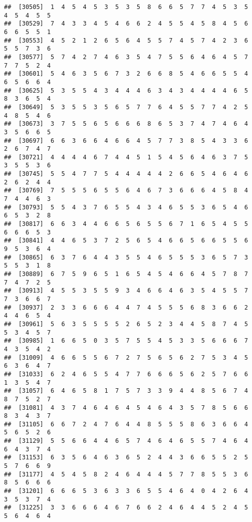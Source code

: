 \documentclass[
]{book}
\begin{document}
\begin{verbatim}
##  [30505]  1  4  5  4  5  3  5  3  5  8  6  6  5  7  7  4  5  3  5  4  5  4  5  5
##  [30529]  7  4  3  3  4  5  4  6  6  2  4  5  5  4  5  8  4  5  6  6  6  5  5  1
##  [30553]  4  5  2  1  2  6  5  6  4  5  5  7  4  5  7  4  2  3  6  5  5  7  3  6
##  [30577]  5  7  4  2  7  4  6  3  5  4  7  5  5  6  4  6  4  5  7  7  7  5  2  4
##  [30601]  5  4  6  3  5  6  7  3  2  6  6  8  5  4  6  6  5  5  4  6  5  6  6  4
##  [30625]  5  3  5  5  4  3  4  4  4  6  3  4  3  4  4  4  4  6  5  8  3  6  5  4
##  [30649]  5  3  5  5  3  5  6  5  7  7  6  4  5  5  7  7  4  2  5  4  8  5  4  6
##  [30673]  3  7  5  5  6  5  6  6  6  8  6  5  3  7  4  7  4  6  4  3  5  6  6  5
##  [30697]  6  6  3  6  6  4  6  6  4  5  7  7  3  8  5  4  3  3  6  2  6  7  4  7
##  [30721]  4  4  4  4  6  7  4  4  5  1  5  4  5  6  4  6  3  7  5  3  5  5  3  6
##  [30745]  5  5  4  7  7  5  4  4  4  4  4  2  6  6  5  4  6  4  6  2  6  2  4  4
##  [30769]  7  5  5  5  6  5  5  6  4  6  7  3  6  6  6  4  5  8  4  7  4  4  6  3
##  [30793]  5  5  4  3  7  6  5  5  4  3  4  6  5  5  3  6  5  4  6  6  5  3  2  8
##  [30817]  6  6  3  4  4  6  6  5  6  5  5  6  7  1  6  5  4  5  5  6  6  6  5  3
##  [30841]  4  4  6  5  3  7  2  5  6  5  4  6  6  5  6  6  5  5  6  9  5  3  6  4
##  [30865]  6  3  7  6  4  4  3  5  5  4  6  5  5  5  3  6  5  7  3  5  5  3  1  8
##  [30889]  6  7  5  9  6  5  1  6  5  4  5  4  6  6  4  5  7  8  7  7  4  7  2  5
##  [30913]  4  5  5  3  5  5  9  3  4  6  6  4  6  3  5  4  5  5  7  7  3  6  6  7
##  [30937]  2  3  3  6  6  6  4  4  7  4  5  5  5  6  8  3  6  6  2  4  4  6  5  4
##  [30961]  5  6  3  5  5  5  5  2  6  5  2  3  4  4  5  8  7  4  5  5  3  4  5  7
##  [30985]  1  6  6  5  0  3  5  7  5  5  4  5  3  3  5  6  6  6  7  4  3  5  4  2
##  [31009]  4  6  6  5  5  6  7  2  7  5  6  5  6  2  7  5  3  4  5  6  3  6  4  7
##  [31033]  6  2  4  6  5  5  4  7  7  6  6  6  5  6  2  5  7  6  6  1  3  5  4  7
##  [31057]  6  4  6  5  8  1  7  5  7  3  3  9  4  4  8  5  6  7  4  8  7  5  2  7
##  [31081]  4  3  7  4  6  4  6  4  5  4  6  4  3  5  7  8  5  6  6  8  3  4  3  7
##  [31105]  6  6  7  2  4  7  6  4  4  8  5  5  5  8  6  3  6  6  4  5  6  5  2  6
##  [31129]  5  5  6  6  4  4  6  5  7  4  6  4  6  5  5  7  4  6  4  6  4  3  7  4
##  [31153]  6  3  5  6  4  6  3  6  5  2  4  4  3  6  6  5  5  2  5  5  7  6  6  9
##  [31177]  4  5  4  5  8  2  4  6  4  4  4  5  7  7  8  5  5  3  6  8  5  6  6  6
##  [31201]  6  6  6  5  3  6  3  3  6  5  5  4  6  4  0  4  2  6  4  3  5  3  7  4
##  [31225]  3  3  6  6  6  4  6  7  6  6  2  4  6  4  4  5  2  4  5  5  6  4  6  4

\end{verbatim}
\end{document}
